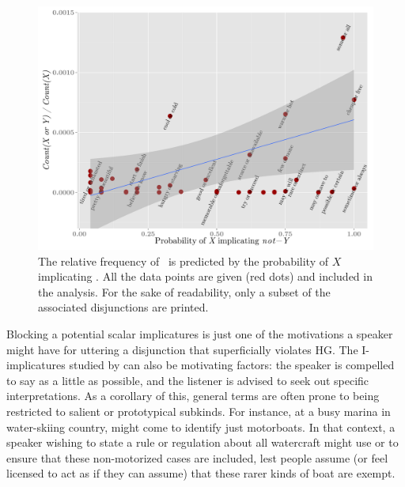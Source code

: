 \documentclass[12pt,twoside]{article}
\renewcommand{\_}{\textbf{\textunderscore\hspace{-4pt}\textunderscore\hspace{-3pt}\textunderscore\hspace{-4pt}\textunderscore}\hspace{0.5pt}}			%
\begin{document}
\begin{figure}[tp]
  \centering
  \includegraphics[width=1\textwidth]{fig/disjunction-and-implicature}
  \caption{The relative frequency of \XorY\ is predicted by the
    probability of $X$ implicating .  All the data points
    are given (red dots) and included in the analysis. For the sake of
    readability, only a subset of the associated disjunctions are
    printed.}
  \label{fig:chemla}
\end{figure}

Blocking a potential scalar implicatures is just one of the
motivations a speaker might have for uttering a disjunction that
superficially violates HG. The I-implicatures studied by
\citet{Levinson00} can also be motivating factors: the speaker is
compelled to say as a little as possible, and the listener is advised
to seek out specific interpretations. As a corollary of this, general
terms are often prone to being restricted to salient or prototypical
subkinds. For instance, at a busy marina in water-skiing country,
 might come to identify just motorboats. In that context, a
speaker wishing to state a rule or regulation about all watercraft
might use  or  to ensure that
these non-motorized cases are included, lest people assume (or feel
licensed to act as if they can assume) that these rarer kinds of boat
are exempt.

\end{document}

